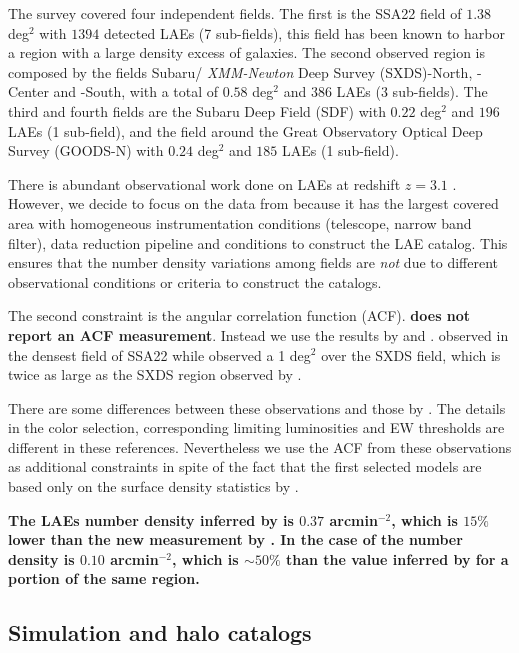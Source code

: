 \documentclass[usenatbib]{mn2e}
\begin{document}
The survey covered four independent fields. The first is the SSA22
field of $1.38$ deg$^2$ with $1394$ detected LAEs (7 sub-fields), this
field has been known to harbor a region with a large density excess of
galaxies. The second observed region is composed by the fields Subaru/{\it
  XMM-Newton} Deep Survey (SXDS)-North, -Center and -South, with a
total of $0.58$ deg$^2$ and $386$ LAEs (3 sub-fields). The third and
fourth fields are the Subaru Deep Field (SDF) with $0.22$ deg$^2$ and
$196$ LAEs (1 sub-field), and the field around the Great Observatory
Optical Deep Survey  (GOODS-N) with $0.24$ deg$^2$ and $185$ LAEs (1
sub-field).  

There is abundant observational work done on LAEs at redshift $z=3.1$
\citep{Kudritzki2000,Matsuda2005,Gawiser2007,Nilsson2007,Ouchi2008}.
However, we decide to focus on the data from \cite{Yamada2012} because
it has the largest covered area with homogeneous instrumentation
conditions (telescope, narrow band filter), data reduction pipeline
and conditions to construct the LAE catalog. This ensures that the
number density variations among fields are \emph{not} due to different
observational conditions or criteria to construct the catalogs.

The second constraint is the angular correlation function
(ACF). {\bf \cite{Yamada2012} does not report an ACF measurement}. Instead
we use the results by \cite{Hayashino2004} and
\cite{Ouchi2008,Ouchi2010}. \cite{Hayashino2004} observed in the
densest field of SSA22 while \cite{Ouchi2008} observed a 1 deg$^2$
over the SXDS field, which is twice as large as the SXDS region
observed by \cite{Yamada2012}.

There are some differences between these observations and those by
\cite{Yamada2012}. The details in the color selection, corresponding
limiting luminosities and EW thresholds are different in these
references. Nevertheless we use the ACF from these observations as
additional constraints in spite of the fact that the first selected
models are based only on the surface density statistics by \cite{Yamada2012}.  

{\bf The LAEs number density inferred by \cite{Hayashino2004} is
  $0.37$ arcmin$^{-2}$, which is $15\%$ lower than the new measurement
by \cite{Yamada2012}. In the case of \cite{Ouchi2008} the number
density is $0.10$ arcmin$^{-2}$, which is $\sim 50\%$ than the value
inferred by \cite{Yamada2012} for a portion of the same region.}

\subsection{Simulation and halo catalogs}
\end{document}
